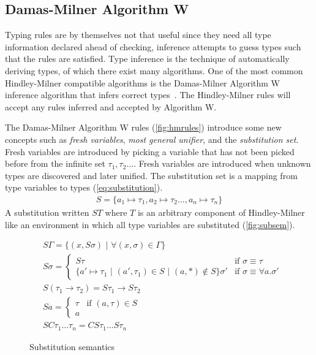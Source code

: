 \documentclass[11pt,oneside,a4paper]{report}
\begin{document}
\subsection{Damas-Milner Algorithm W}
Typing rules are by themselves not that useful since they need all type information declared ahead of checking, inference attempts to guess types such that the rules are satisfied.
Type inference is the technique of automatically deriving types, of which there exist many algorithms.
One of the most common Hindley-Milner compatible algorithms is the Damas-Milner Algorithm W inference algorithm that infers correct types~\cite{damas1984type,damas1982principal}.
The Hindley-Milner rules will accept any rules inferred and accepted by Algorithm W.

The Damas-Milner Algorithm W rules (\autoref{fig:hmrules}) introduce some new concepts such as \textit{fresh variables}, \textit{most general unifier}, and the \textit{substitution set}.
Fresh variables are introduced by picking a variable that has not been picked before from the infinite set $\tau_1, \tau_2 \dots $.
Fresh variables are introduced when unknown types are discovered and later unified.
The substitution set is a mapping from type variables to types (\autoref{eq:substitution}).
\begin{align}
    S = \{ a_1 \mapsto \tau_1, a_2 \mapsto \tau_2 \dots , a_n \mapsto \tau_n \} 
    \label{eq:substitution}
\end{align}
A substitution written $S T$ where $T$ is an arbitrary component of Hindley-Milner like an environment in which all type variables are substituted (\autoref{fig:subsem}).
\begin{figure}
\begin{mdframed}
\begin{align}
    &S \Gamma = \{ (x, S \sigma) \,\,|\,\, \forall (x, \sigma) \in \Gamma \} \tag{Environment}\\
    &S \sigma  = 
        \begin{cases}
            S \tau & \text{if } \sigma \equiv \tau\\
            \{ a' \mapsto \tau_1 \,\,|\,\, (a', \tau_1) \in S \,\,|\,\, (a, *) \notin S \} \sigma' & \text{if } \sigma \equiv \forall a . \sigma'
        \end{cases}
    \tag{Poly}\\
    &S (\tau_1 \rightarrow \tau_2) = S\tau_1 \rightarrow S\tau_2 \tag{Arrow}\\
    &S a = 
        \begin{cases}
            \tau & \text{if } (a, \tau) \in S\\
            a & 
        \end{cases}
    \tag{Typevariable}\\
    &S C \tau_1 \dots \tau_n = C S\tau_1 \dots S\tau_n \tag{Type constructor}
\end{align}
\end{mdframed}
    \caption{Substitution semantics}
    \label{fig:subsem}
\end{figure}
\end{document}
